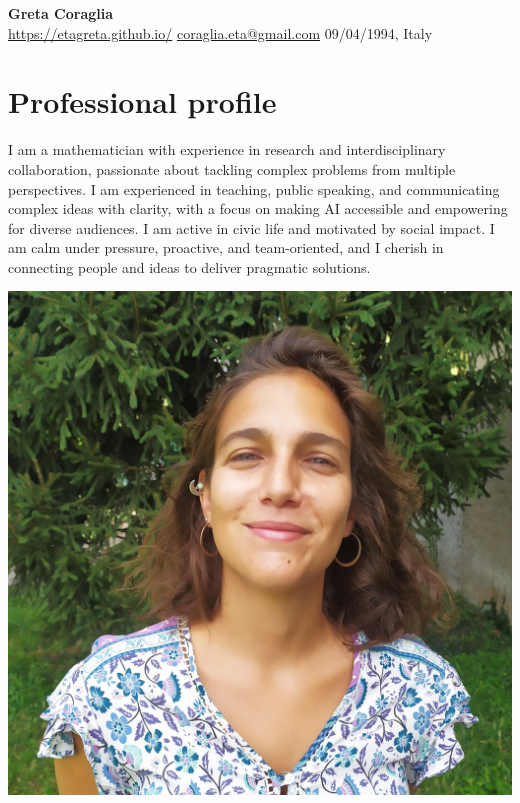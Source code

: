 \documentclass[a4paper,11pt]{article}
\begin{document}
\pagestyle{empty}



\begin{center}
    \textbf{\Huge Greta Coraglia} \\
\vspace{2mm}
     \url{https://etagreta.github.io/}
	\qquad
     \href{mailto:coraglia.eta@gmail.com}{coraglia.eta@gmail.com}
	\qquad
     09/04/1994, Italy
\end{center}


\space
\vspace{.5cm}

\begin{minipage}{0.58\textwidth}
\section*{ Professional profile}
I am a mathematician with experience in research and interdisciplinary collaboration, passionate about tackling complex problems from multiple perspectives. I am experienced in teaching, public speaking, and communicating complex ideas with clarity, with a focus on making AI accessible and empowering for diverse audiences. I am active in civic life and motivated by social impact. I am calm under pressure, proactive, and team-oriented, and I cherish in connecting people and ideas to deliver pragmatic solutions.
\end{minipage}\hfill
\begin{minipage}{0.35\textwidth}
    \begin{center}
    \includegraphics[width=.9\textwidth]{coraglia.jpg}
	\end{center}
\end{minipage}
\end{document}
